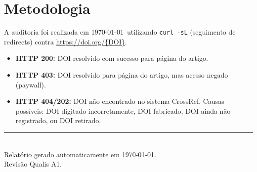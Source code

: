 \section{Metodologia}
A auditoria foi realizada em \today\ utilizando \texttt{curl -sL}
(seguimento de redirects) contra \url{https://doi.org/{DOI}}.
\begin{itemize}
  \item \textbf{HTTP 200:} DOI resolvido com sucesso para página do
        artigo.
  \item \textbf{HTTP 403:} DOI resolvido para página do artigo, mas
        acesso negado (paywall).
  \item \textbf{HTTP 404/202:} DOI não encontrado no sistema CrossRef.
        Causas possíveis: DOI digitado incorretamente, DOI fabricado,
        DOI ainda não registrado, ou DOI retirado.
\end{itemize}

\vfill
\begin{center}
\rule{0.5\textwidth}{0.4pt}\\
\small{Relatório gerado automaticamente em \today.}\\
\small{Revisão Qualis A1.}
\end{center}
